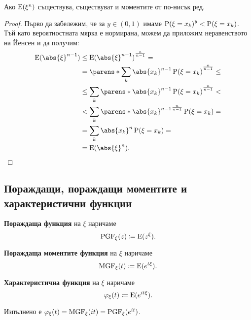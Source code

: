 \documentclass{../../common/topic}
\begin{document}
\begin{proposition}\label{thm:lower_order_moments_exist}
  Ако \( \operatorname{E}(\xi^n) \) съществува, съществуват и моментите от по-нисък ред.
\end{proposition}
\begin{proof}
  Първо да забележим, че за \( y \in (0, 1) \) имаме \( {\operatorname{P}(\xi = x_k)}^y < \operatorname{P}(\xi = x_k) \). Тъй като вероятностната мярка е нормирана, можем да приложим неравенството на Йенсен и да получим:
  \begin{align*}
    \Expect({\abs{\xi}}^{n-1})
    &\leq
    {\Expect({\abs{\xi}}^{n-1})}^{\frac n {n-1}}
    = \\ &=
    {\parens*{ \sum_k {\abs{x_k}}^{n-1} \Prob(\xi = x_k) }}^{\frac n {n-1}}
    \leq \\ &\leq
    \sum_k {\parens*{{\abs{x_k}}^{n-1} \Prob(\xi = x_k) }}^{\frac n {n-1}}
    < \\ &<
    \sum_k {\parens*{{\abs{x_k}}^{n-1}}}^{\frac n {n-1}} \Prob(\xi = x_k)
    = \\ &=
    \sum_k {\abs{x_k}}^n \Prob(\xi = x_k)
    = \\ &=
    \Expect({\abs{\xi}}^n).
  \end{align*}
\end{proof}

\subsection{Пораждащи, пораждащи моментите и характеристични функции}

\begin{definition}
  \textbf{Пораждаща функция} на \( \xi \) наричаме
  \begin{equation*}
    \operatorname{PGF}_\xi (z) \coloneqq \operatorname{E}(z^\xi).
  \end{equation*}

  \textbf{Пораждаща моментите функция} на \( \xi \) наричаме
  \begin{equation*}
    \operatorname{MGF}_\xi (t) \coloneqq \operatorname{E}(e^{t\xi}).
  \end{equation*}

  \textbf{Характеристична функция} на \( \xi \) наричаме
  \begin{equation*}
    \varphi_\xi (t) \coloneqq \operatorname{E}(e^{it\xi}).
  \end{equation*}

  Изпълнено е \( \varphi_\xi(t) = \operatorname{MGF}_\xi(it) = \operatorname{PGF}_\xi(e^{it}) \).
\end{definition}
\end{document}
